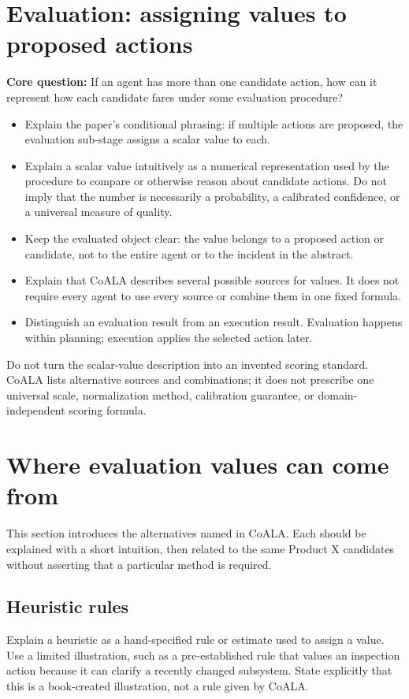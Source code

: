 \section{Evaluation: assigning values to proposed actions}
\textbf{Core question:} If an agent has more than one candidate action, how can it represent how each candidate fares under some evaluation procedure?
\begin{itemize}
  \item Explain the paper's conditional phrasing: if multiple actions are proposed, the evaluation sub-stage assigns a scalar value to each.
  \item Explain a scalar value intuitively as a numerical representation used by the procedure to compare or otherwise reason about candidate actions. Do not imply that the number is necessarily a probability, a calibrated confidence, or a universal measure of quality.
  \item Keep the evaluated object clear: the value belongs to a proposed action or candidate, not to the entire agent or to the incident in the abstract.
  \item Explain that CoALA describes several possible sources for values. It does not require every agent to use every source or combine them in one fixed formula.
  \item Distinguish an evaluation result from an execution result. Evaluation happens within planning; execution applies the selected action later.
\end{itemize}
\begin{notebox}
Do not turn the scalar-value description into an invented scoring standard. CoALA lists alternative sources and combinations; it does not prescribe one universal scale, normalization method, calibration guarantee, or domain-independent scoring formula.
\end{notebox}

\section{Where evaluation values can come from}
This section introduces the alternatives named in CoALA. Each should be explained with a short intuition, then related to the same Product X candidates without asserting that a particular method is required.
\subsection{Heuristic rules}
Explain a heuristic as a hand-specified rule or estimate used to assign a value. Use a limited illustration, such as a pre-established rule that values an inspection action because it can clarify a recently changed subsystem. State explicitly that this is a book-created illustration, not a rule given by CoALA.
